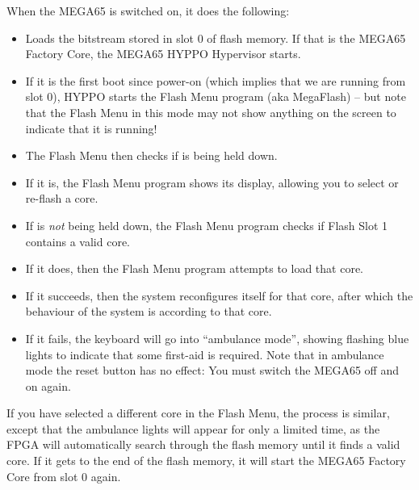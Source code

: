 When the MEGA65 is switched on, it does the following:
\begin{itemize}
\item Loads the bitstream stored in slot 0 of flash memory. If that is the MEGA65 Factory Core, the MEGA65
  HYPPO Hypervisor starts.
\item If it is the first boot since power-on (which implies that we are running from slot 0), HYPPO starts the Flash Menu program (aka MegaFlash) -- but note that the Flash Menu in
      this mode may not show anything on the screen to indicate that it is running!
\item The Flash Menu then checks if  is being held down.
\item If it is, the Flash Menu program shows its display, allowing you to select or re-flash a core.
\item If  is {\em not} being held down, the Flash Menu program checks if Flash Slot 1 contains a valid
      core.
\item If it does, then the Flash Menu program attempts to load that core.
\item If it succeeds, then the system reconfigures itself for that core, after which the behaviour of the system is
      according to that core.
\item If it fails, the keyboard will go into ``ambulance mode'', showing flashing blue lights to indicate that some
      first-aid is required. Note that in ambulance mode the reset button has no effect: You must switch the
      MEGA65 off and on again.
\end{itemize}

If you have selected a different core in the Flash Menu, the process is similar, except that the ambulance lights will appear for only a limited time, as the FPGA will automatically search through the flash memory until it finds a valid core. If it gets to the end of the flash memory, it will start the MEGA65 Factory Core from slot 0 again.
